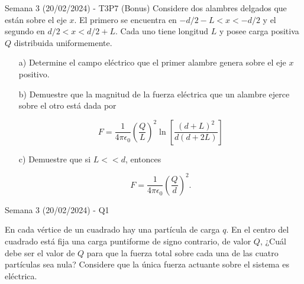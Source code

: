 \begin{frame}{Semana 3 (20/02/2024) - T3P7 (Bonus)}
    Considere dos alambres delgados que est\'an sobre el eje $x$. El primero se encuentra en $-d/2-L<x<-d/2$ y el segundo en $d/2<x<d/2+L$. Cada uno tiene longitud $L$ y posee carga positiva $Q$ distribuida uniformemente.
    
    \begin{itemize}
        \item[a)] Determine el campo el\'ectrico que el primer alambre genera sobre el eje $x$ positivo.
        \item[b)] Demuestre que la magnitud de la fuerza el\'ectrica que un alambre ejerce sobre el otro est\'a dada por
        
        \begin{equation}
            F=\frac{1}{4\pi\epsilon_0}\left(\frac{Q}{L}\right)^2\ln\left[\frac{\left(d+L\right)^2}{d(d+2L)}\right]
        \end{equation}
        
        \item[c)] Demuestre que si $L<<d$, entonces
        
        \begin{equation}
            F=\frac{1}{4\pi\epsilon_0}\left(\frac{Q}{d}\right)^2.
        \end{equation}
        
    \end{itemize}

\end{frame}

\begin{frame}{Semana 3 (20/02/2024) - Q1}
    
    En cada vértice de un cuadrado hay una partícula de carga $q$. En el centro del cuadrado está fija una carga puntiforme de signo contrario, de valor $Q$, ¿Cuál debe ser el valor de $Q$ para que la fuerza total sobre cada una de las cuatro partículas sea nula? Considere que la única fuerza actuante sobre el sistema es eléctrica.

\end{frame}

